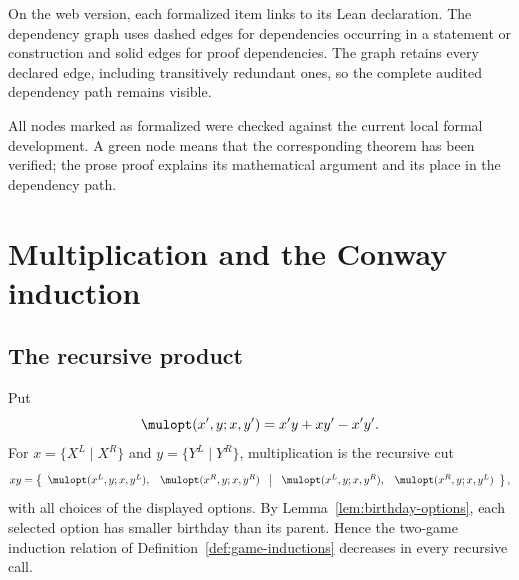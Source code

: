 On the web version, each formalized item links to its Lean declaration.  The dependency
graph uses dashed edges for dependencies occurring in a statement or construction and solid
edges for proof dependencies.  The graph retains every declared edge, including transitively
redundant ones, so the complete audited dependency path remains visible.

All nodes marked as formalized were checked against the current local formal development.  A
green node means that the corresponding theorem has been verified; the prose proof explains
its mathematical argument and its place in the dependency path.


\chapter{Multiplication and the Conway induction}

\section{The recursive product}

\begin{definition}
  \label{def:game-mul}
  \leanok
  Put
  \[
    \mulopt(x',y;x,y')=x'y+xy'-x'y'.
  \]
  For \(x=\{X^L\mid X^R\}\) and \(y=\{Y^L\mid Y^R\}\), multiplication is the recursive cut
  \[
    xy=
    \left\{
      \begin{array}{ll}
        \mulopt(x^L,y;x,y^L),&\mulopt(x^R,y;x,y^R)
      \end{array}
      \ \middle|\
      \begin{array}{ll}
        \mulopt(x^L,y;x,y^R),&\mulopt(x^R,y;x,y^L)
      \end{array}
    \right\},
  \]
  with all choices of the displayed options.  By
  Lemma~\ref{lem:birthday-options}, each selected option has smaller birthday
  than its parent.  Hence the two-game induction relation of
  Definition~\ref{def:game-inductions} decreases in every recursive call.
\end{definition}

